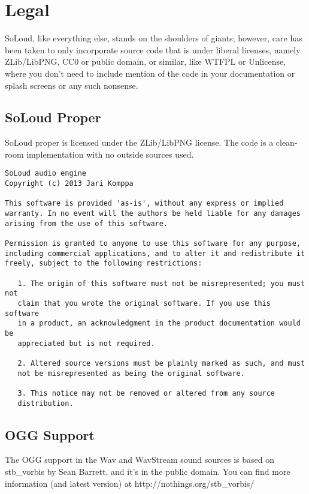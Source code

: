 
\chapter{Legal}

SoLoud, like everything else, stands on the shoulders of giants; however, care has been taken to only incorporate source code that is under liberal licenses, namely ZLib/LibPNG, CC0 or public domain, or similar, like WTFPL or Unlicense, where you don't need to include mention of the code in your documentation or splash screens or any such nonsense.

\section{SoLoud Proper}

SoLoud proper is licensed under the ZLib/LibPNG license. The code is a clean-room implementation with no outside sources used.

\scriptsize
\begin{verbatim}
SoLoud audio engine
Copyright (c) 2013 Jari Komppa

This software is provided 'as-is', without any express or implied
warranty. In no event will the authors be held liable for any damages
arising from the use of this software.

Permission is granted to anyone to use this software for any purpose,
including commercial applications, and to alter it and redistribute it
freely, subject to the following restrictions:

   1. The origin of this software must not be misrepresented; you must not
   claim that you wrote the original software. If you use this software
   in a product, an acknowledgment in the product documentation would be
   appreciated but is not required.

   2. Altered source versions must be plainly marked as such, and must 
   not be misrepresented as being the original software.

   3. This notice may not be removed or altered from any source
   distribution.
\end{verbatim}
\normalsize

\section{OGG Support}
The OGG support in the Wav and WavStream sound sources is based on stb\_vorbis by Sean Barrett, and it's in the public domain. You can find more information (and latest version) at http://nothings.org/stb\_vorbis/

